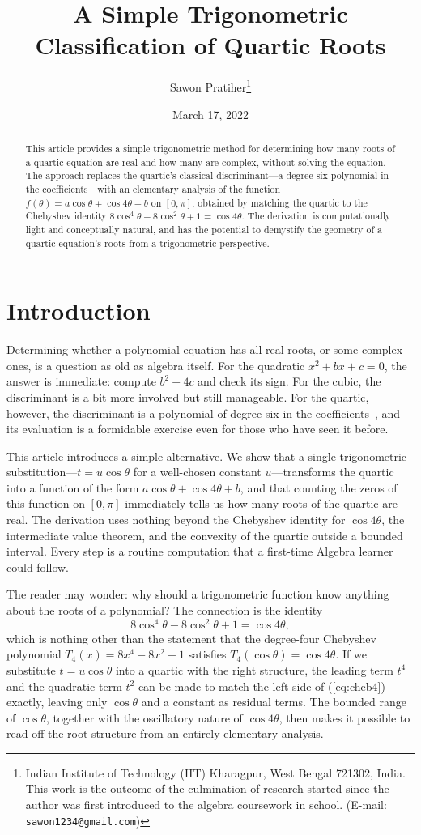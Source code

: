 \documentclass[12pt]{article}
\title{A Simple Trigonometric Classification of Quartic Roots}
\author{Sawon Pratiher\footnote{Indian Institute of Technology (IIT) Kharagpur, West Bengal 721302, India. This work is the outcome of the culmination of research started since the author was first introduced to the algebra coursework in school. (E-mail: \texttt{sawon1234@gmail.com})}}
\date{March 17, 2022}
\theoremstyle{definition}
\theoremstyle{remark}
\begin{document}
\maketitle

\begin{abstract}
This article provides a simple trigonometric method for determining how many roots of a quartic equation are real and how many are complex, without solving the equation. The approach replaces the quartic's classical discriminant---a degree-six polynomial in the coefficients---with an elementary analysis of the function $f(\theta) = a\cos\theta + \cos 4\theta + b$ on $[0,\pi]$, obtained by matching the quartic to the Chebyshev identity $8\cos^4\!\theta - 8\cos^2\!\theta + 1 = \cos 4\theta$. The derivation is computationally light and conceptually natural, and has the potential to demystify the geometry of a quartic equation's roots from a trigonometric perspective.
\end{abstract}

\section{Introduction}

Determining whether a polynomial equation has all real roots, or some complex ones, is a question as old as algebra itself. For the quadratic $x^2 + bx + c = 0$, the answer is immediate: compute $b^2 - 4c$ and check its sign. For the cubic, the discriminant is a bit more involved but still manageable. For the quartic, however, the discriminant is a polynomial of degree six in the coefficients~\cite{Rees1922}, and its evaluation is a formidable exercise even for those who have seen it before.

This article introduces a simple alternative. We show that a single trigonometric substitution---$t = u\cos\theta$ for a well-chosen constant $u$---transforms the quartic into a function of the form $a\cos\theta + \cos 4\theta + b$, and that counting the zeros of this function on $[0,\pi]$ immediately tells us how many roots of the quartic are real. The derivation uses nothing beyond the Chebyshev identity for $\cos 4\theta$, the intermediate value theorem, and the convexity of the quartic outside a bounded interval. Every step is a routine computation that a first-time Algebra learner could follow.

The reader may wonder: why should a trigonometric function know anything about the roots of a polynomial? The connection is the identity
\begin{equation}\label{eq:cheb4}
8\cos^4\theta - 8\cos^2\theta + 1 = \cos 4\theta,
\end{equation}
which is nothing other than the statement that the degree-four Chebyshev polynomial $T_4(x) = 8x^4 - 8x^2 + 1$ satisfies $T_4(\cos\theta) = \cos 4\theta$. If we substitute $t = u\cos\theta$ into a quartic with the right structure, the leading term $t^4$ and the quadratic term $t^2$ can be made to match the left side of (\ref{eq:cheb4}) exactly, leaving only $\cos\theta$ and a constant as residual terms. The bounded range of $\cos\theta$, together with the oscillatory nature of $\cos 4\theta$, then makes it possible to read off the root structure from an entirely elementary analysis.
\end{document}
